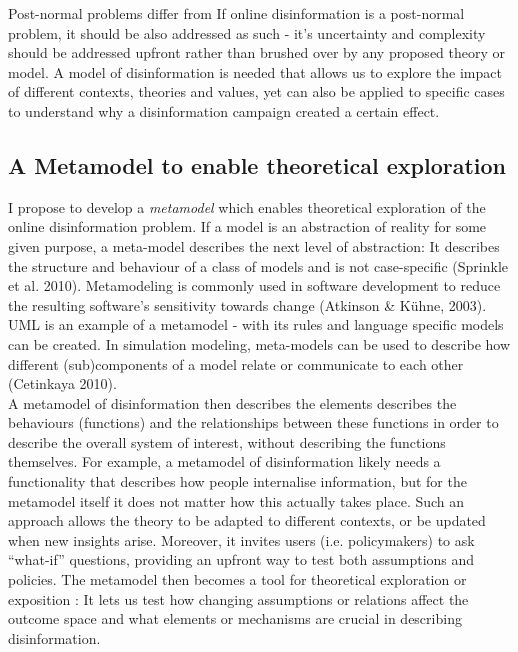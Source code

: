  Post-normal problems differ from If online disinformation is a post-normal problem, it should be also addressed as such - it's uncertainty and complexity should be addressed upfront rather than brushed over by any proposed theory or model. A model of disinformation is needed that allows us to explore the impact of different contexts, theories and values, yet can also be applied to specific cases to understand why a disinformation campaign created a certain effect.
 


\subsection{A Metamodel to enable theoretical exploration}
I propose to develop a \textit{metamodel} which enables theoretical exploration of the online disinformation problem. If a model is an abstraction of reality for some given purpose, a meta-model describes the next level of abstraction: It describes the structure and behaviour of a class of models and is not case-specific (Sprinkle et al. 2010). Metamodeling is commonly used in software development to reduce the resulting software's sensitivity towards change (Atkinson \& Kühne, 2003). UML is an example of a metamodel - with its rules and language specific models can be created. In simulation modeling, meta-models can be used to describe how different (sub)components of a model relate or communicate to each other (Cetinkaya 2010). \\

A metamodel of disinformation then describes the elements describes the behaviours (functions) and the relationships between these functions in order to describe the overall system of interest, without describing the functions themselves. For example, a metamodel of disinformation likely needs a functionality that describes how people internalise information, but for the metamodel itself it does not matter how this actually takes place. Such an approach allows the theory to be adapted to different contexts, or be updated when new insights arise. Moreover, it invites users (i.e. policymakers) to ask “what-if” questions, providing an upfront way to test both assumptions and policies. The metamodel then becomes a tool for theoretical exploration or exposition \cite{Edmonds2017}: It lets us test how changing assumptions or relations affect the outcome space and what elements or mechanisms are crucial in describing disinformation. \\

